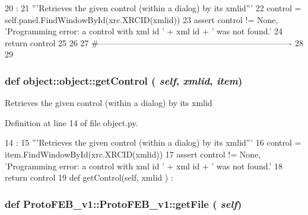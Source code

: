 \begin{DoxyCode}
20                                  :
21         '''Retrieves the given control (within a dialog) by its xmlid'''
22         control = self.panel.FindWindowById(xrc.XRCID(xmlid))
23         assert control != None, 'Programming error: a control with xml id ' + xml
      id + ' was not found.'
24         return control
25 
26                 
27 #----------------------------------------------------------------------
28 
29     
    
\end{DoxyCode}
\hypertarget{classobject_1_1object_ac765747a2b581d48eeb94e600c31fc3f}{
\subsubsection[{getControl}]{\setlength{\rightskip}{0pt plus 5cm}def object::object::getControl ( {\em self}, \/   {\em xmlid}, \/   {\em item})}}
\label{classobject_1_1object_ac765747a2b581d48eeb94e600c31fc3f}
\begin{DoxyVerb}Retrieves the given control (within a dialog) by its xmlid\end{DoxyVerb}
 

Definition at line 14 of file object.py.


\begin{DoxyCode}
14                                        :
15         '''Retrieves the given control (within a dialog) by its xmlid'''
16         control = item.FindWindowById(xrc.XRCID(xmlid))
17         assert control != None, 'Programming error: a control with xml id ' + xml
      id + ' was not found.'
18         return control
19 
    def getControl(self, xmlid ) :
\end{DoxyCode}
\hypertarget{classProtoFEB__v1_1_1ProtoFEB__v1_a336d0a355662880c667ac1da3c69d1ab}{
\subsubsection[{getFile}]{\setlength{\rightskip}{0pt plus 5cm}def ProtoFEB\_\-v1::ProtoFEB\_\-v1::getFile ( {\em self})}}
\label{classProtoFEB__v1_1_1ProtoFEB__v1_a336d0a355662880c667ac1da3c69d1ab}


